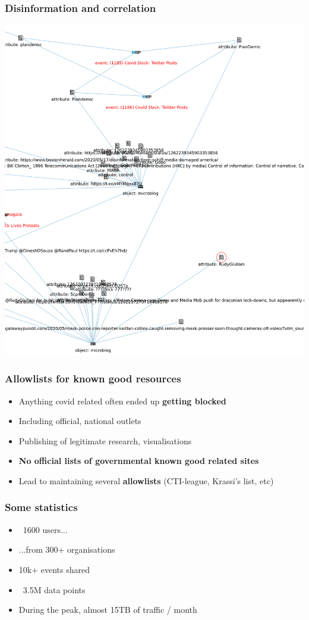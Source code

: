 \begin{frame}
    \frametitle{Disinformation and correlation}
    \includegraphics[scale=0.14]{misinfo-correlation.png}
\end{frame}

\begin{frame}
 \frametitle{Allowlists for known good resources}
 \begin{itemize}
         \item Anything covid related often ended up {\bf getting blocked}
         \item Including official, national outlets
         \item Publishing of legitimate research, visualisations
         \item {\bf No official lists of governmental known good related sites}
         \item Lead to maintaining several {\bf allowlists} (CTI-league, Krassi's list, etc)
 \end{itemize}
\end{frame}

\begin{frame}
 \frametitle{Some statistics}
 \begin{itemize}
         \item ~1600 users...
         \item ...from 300+ organisations
         \item 10k+ events shared
         \item ~3.5M data points
         \item During the peak, almost 15TB of traffic / month
 \end{itemize}
\end{frame}

